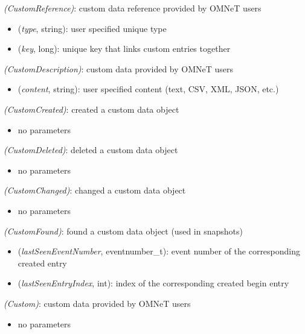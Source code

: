  \textit{(CustomReference)}: custom data reference provided by OMNeT users

\begin{itemize}
  \item {} (\textit{type}, string): user specified unique type
  \item {} (\textit{key}, long): unique key that links custom entries together
\end{itemize}

 \textit{(CustomDescription)}: custom data provided by OMNeT users

\begin{itemize}
  \item {} (\textit{content}, string): user specified content (text, CSV, XML, JSON, etc.)
\end{itemize}

 \textit{(CustomCreated)}: created a custom data object

\begin{itemize}
  \item no parameters
\end{itemize}

 \textit{(CustomDeleted)}: deleted a custom data object

\begin{itemize}
  \item no parameters
\end{itemize}

 \textit{(CustomChanged)}: changed a custom data object

\begin{itemize}
  \item no parameters
\end{itemize}

 \textit{(CustomFound)}: found a custom data object (used in snapshots)

\begin{itemize}
  \item \tbf{\#} (\textit{lastSeenEventNumber}, eventnumber\_t): event number of the corresponding created entry
  \item {} (\textit{lastSeenEntryIndex}, int): index of the corresponding created begin entry
\end{itemize}

 \textit{(Custom)}: custom data provided by OMNeT users

\begin{itemize}
  \item no parameters
\end{itemize}


